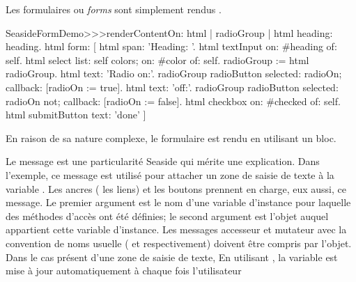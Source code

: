 \documentclass[a4paper,10pt,twoside]{book}
\begin{document}
Les formulaires ou \emph{forms} sont simplement rendus .


\begin{code}{} %
SeasideFormDemo>>>renderContentOn: html
	| radioGroup |
	html heading: heading.
	html form: [
		html span: 'Heading: '.
		html textInput on: #heading of: self.
		html select
			list: self colors;
			on: #color of: self.
		radioGroup := html radioGroup.
		html text: 'Radio on:'.
		radioGroup radioButton
			selected: radioOn;
			callback: [radioOn := true].
		html text: 'off:'.
		radioGroup radioButton
			selected: radioOn not;
			callback: [radioOn := false].
		html checkbox on: #checked of: self.
		html submitButton
			text: 'done' ]
\end{code}{}

En raison de sa nature complexe, le formulaire est rendu en utilisant
un bloc.

Le message  est une particularité Seaside
qui mérite une explication.
Dans l'exemple, ce message est utilisé pour attacher un zone de saisie
de texte à la variable .
Les ancres (\ie{} les liens) et les boutons prennent en charge, eux
aussi, ce message.
Le premier argument est le nom d'une variable d'instance pour laquelle
des méthodes d'accès
ont été définies; le second argument est l'objet auquel appartient
cette variable d'instance.
Les messages accesseur et mutateur avec la convention de noms usuelle
(\ie{}  et  respectivement) 
doivent être compris par l'objet.
Dans le cas présent d'une zone de saisie de texte, 
En utilisant , la variable  est
mise à jour automatiquement à chaque fois l'utilisateur 
\end{document}
